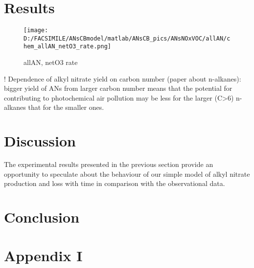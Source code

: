 \documentclass[11pt,a4paper]{article}
\begin{document}
\section{Results} \label{sec:res}
\begin{figure}[h] %
\texttt{[image: D:/FACSIMILE/ANsCBmodel/matlab/ANsCB\_pics/ANsNOxVOC/allAN/chem\_allAN\_netO3\_rate.png]}
\caption{allAN, netO3 rate}\label{fig:allAN_netO3_rate}
\end{figure}

! Dependence of alkyl nitrate yield on carbon number (paper about n-alkanes): bigger yield of ANs from larger carbon number means that the potential for contributing to photochemical air pollution may be less for the larger (C>6) n-alkanes that for the smaller ones.

\section{Discussion} \label{sec:discuss}
The experimental results presented in the previous section provide an opportunity to speculate about the behaviour of our simple model of alkyl nitrate production and loss with time in comparison with the observational data. 

\section{Conclusion} \label{sec:conclusion}


\section{Appendix I} \label{sec:appendix1}
\end{document}
